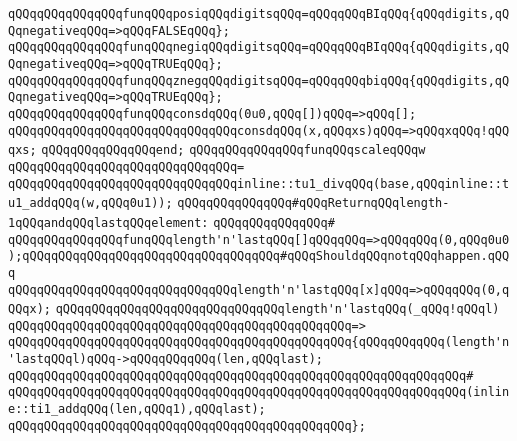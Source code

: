 \newline
\verb|qQQqqQQqqQQqqQQqfunqQQqposiqQQqdigitsqQQq=qQQqqQQqBIqQQq{qQQqdigits,qQQqnegativeqQQq=>qQQqFALSEqQQq};|\newline
\verb|qQQqqQQqqQQqqQQqfunqQQqnegiqQQqdigitsqQQq=qQQqqQQqBIqQQq{qQQqdigits,qQQqnegativeqQQq=>qQQqTRUEqQQq};|\newline
\verb|qQQqqQQqqQQqqQQqfunqQQqznegqQQqdigitsqQQq=qQQqqQQqbiqQQq{qQQqdigits,qQQqnegativeqQQq=>qQQqTRUEqQQq};|\newline
\newline
\verb|qQQqqQQqqQQqqQQqfunqQQqconsdqQQq(0u0,qQQq[])qQQq=>qQQq[];|\newline
\verb|qQQqqQQqqQQqqQQqqQQqqQQqqQQqqQQqconsdqQQq(x,qQQqxs)qQQq=>qQQqxqQQq!qQQqxs;|\newline
\verb|qQQqqQQqqQQqqQQqend;|\newline
\newline
\verb|qQQqqQQqqQQqqQQqfunqQQqscaleqQQqw|\newline
\verb|qQQqqQQqqQQqqQQqqQQqqQQqqQQqqQQq=|\newline
\verb|qQQqqQQqqQQqqQQqqQQqqQQqqQQqqQQqinline::tu1_divqQQq(base,qQQqinline::tu1_addqQQq(w,qQQq0u1));|\newline
\newline
\verb|qQQqqQQqqQQqqQQq#qQQqReturnqQQqlength-1qQQqandqQQqlastqQQqelement:|\newline
\verb|qQQqqQQqqQQqqQQq#|\newline
\verb|qQQqqQQqqQQqqQQqfunqQQqlength'n'lastqQQq[]qQQqqQQq=>qQQqqQQq(0,qQQq0u0);qQQqqQQqqQQqqQQqqQQqqQQqqQQqqQQqqQQq#qQQqShouldqQQqnotqQQqhappen.qQQq|\newline
\verb|qQQqqQQqqQQqqQQqqQQqqQQqqQQqqQQqlength'n'lastqQQq[x]qQQq=>qQQqqQQq(0,qQQqx);|\newline
\newline
\verb|qQQqqQQqqQQqqQQqqQQqqQQqqQQqqQQqlength'n'lastqQQq(_qQQq!qQQql)|\newline
\verb|qQQqqQQqqQQqqQQqqQQqqQQqqQQqqQQqqQQqqQQqqQQqqQQq=>|\newline
\verb|qQQqqQQqqQQqqQQqqQQqqQQqqQQqqQQqqQQqqQQqqQQqqQQq{qQQqqQQqqQQq(length'n'lastqQQql)qQQq->qQQqqQQqqQQq(len,qQQqlast);|\newline
\verb|qQQqqQQqqQQqqQQqqQQqqQQqqQQqqQQqqQQqqQQqqQQqqQQqqQQqqQQqqQQqqQQq#|\newline
\verb|qQQqqQQqqQQqqQQqqQQqqQQqqQQqqQQqqQQqqQQqqQQqqQQqqQQqqQQqqQQqqQQq(inline::ti1_addqQQq(len,qQQq1),qQQqlast);|\newline
\verb|qQQqqQQqqQQqqQQqqQQqqQQqqQQqqQQqqQQqqQQqqQQqqQQq};|\newline
